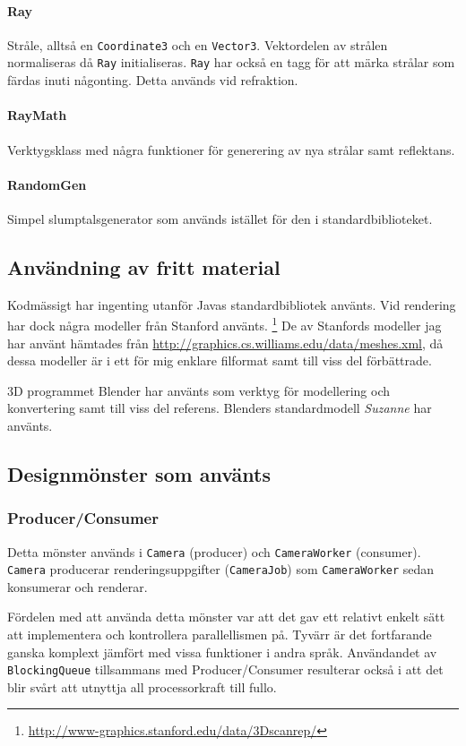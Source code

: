 \documentclass{article}
\begin{document}
\paragraph{Ray}
Stråle, alltså en \texttt{Coordinate3} och en
\texttt{Vector3}. Vektordelen av strålen normaliseras då \texttt{Ray}
initialiseras. \texttt{Ray} har också en tagg för att märka strålar
som färdas inuti någonting. Detta används vid refraktion.

\paragraph{RayMath}
Verktygsklass med några funktioner för generering av nya strålar samt
reflektans.

\paragraph{RandomGen}
Simpel slumptalsgenerator som används istället för den i standardbiblioteket.

\subsection{Användning av fritt material}
Kodmässigt har ingenting utanför Javas standardbibliotek använts. Vid
rendering har dock några modeller från Stanford använts.
\footnote{\url{http://www-graphics.stanford.edu/data/3Dscanrep/}} De
av Stanfords modeller jag har använt hämtades från
\url{http://graphics.cs.williams.edu/data/meshes.xml}, då dessa
modeller är i ett för mig enklare filformat samt till viss del
förbättrade.

3D programmet Blender har använts som verktyg för modellering och
konvertering samt till viss del referens. Blenders standardmodell
\emph{Suzanne} har använts.

\subsection{Designmönster som använts}
\subsubsection{Producer/Consumer}
Detta mönster används i \texttt{Camera} (producer) och
\texttt{CameraWorker} (consumer). \texttt{Camera} producerar
renderingsuppgifter (\texttt{CameraJob}) som \texttt{CameraWorker}
sedan konsumerar och renderar.

Fördelen med att använda detta mönster var att det gav ett relativt
enkelt sätt att implementera och kontrollera parallellismen på. Tyvärr
är det fortfarande ganska komplext jämfört med vissa funktioner i
andra språk. Användandet av \texttt{BlockingQueue} tillsammans med
Producer/Consumer resulterar också i att det blir svårt att utnyttja
all processorkraft till fullo.
\end{document}

